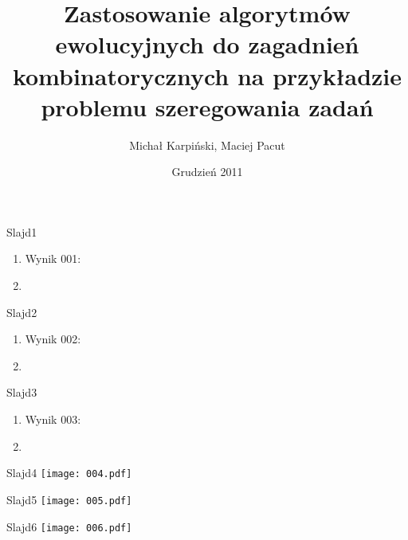 \documentclass{beamer}
\title{Zastosowanie algorytmów ewolucyjnych do zagadnień kombinatorycznych na przykładzie problemu szeregowania zadań}
\author{Michał Karpiński, Maciej Pacut}
\date{Grudzień 2011}
\begin{document}
\maketitle
 
\begin{frame}{Slajd1}
  \begin{enumerate}
    \item Wynik 001:
    \item 
  \end{enumerate}
\end{frame}

\begin{frame}{Slajd2}
  \begin{enumerate}
    \item Wynik 002:
    \item 
  \end{enumerate}
\end{frame}

\begin{frame}{Slajd3}
  \begin{enumerate}
    \item Wynik 003:
    \item 
  \end{enumerate}
\end{frame}

\begin{frame}{Slajd4}
  \texttt{[image: 004.pdf]}
\end{frame}

\begin{frame}{Slajd5}
  \texttt{[image: 005.pdf]}
\end{frame}

\begin{frame}{Slajd6}
  \texttt{[image: 006.pdf]}
\end{frame}
\end{document}

